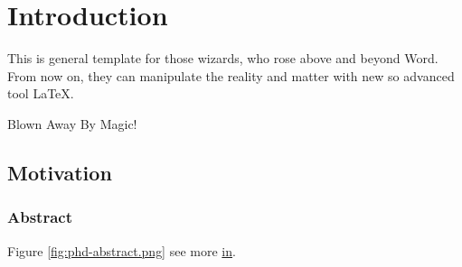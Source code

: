 \chapter{Introduction} %
\label{Chapter1} %

\par This is general template for those wizards, who rose above and beyond Word. From now on, they can manipulate the reality and matter with new so advanced tool \LaTeX{}.

\par  Blown Away By Magic!

\section{Motivation}

\par 

\par 

\par 

\subsection{Abstract}

\par Figure \ref{fig:phd-abstract.png} see more \href{https://phdcomics.com/comics/archive_print.php?comicid=1121}{in}.

